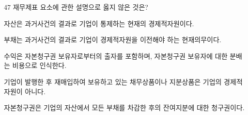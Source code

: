 \begin{question}{47}
재무제표 요소에 관한 설명으로 옳지 않은 것은?
\begin{choices}
  \item 자산은 과거사건의 결과로 기업이 통제하는 현재의 경제적자원이다.
  \item 부채는 과거사건의 결과로 기업이 경제적자원을 이전해야 하는 현재의무이다.
  \item 수익은 자본청구권 보유자로부터의 출자를 포함하며, 자본청구권 보유자에 대한 분배는 비용으로 인식한다.
  \item 기업이 발행한 후 재매입하여 보유하고 있는 채무상품이나 지분상품은 기업의 경제적자원이 아니다.
  \item 자본청구권은 기업의 자산에서 모든 부채를 차감한 후의 잔여지분에 대한 청구권이다.
\end{choices}
\end{question}

